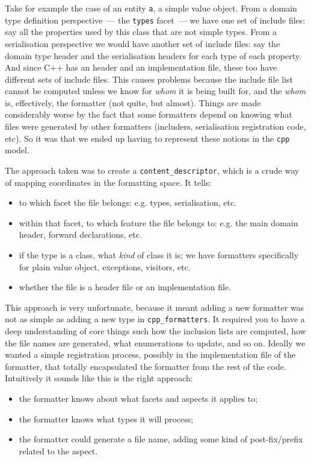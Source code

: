 \documentclass{book}
\begin{document}
Take for example the case of an entity \texttt{a}, a simple value
object. From a domain type definition perspective~--- the
\texttt{types} facet~--- we have one set of include files: say all the
properties used by this class that are not simple types. From a
serialisation perspective we would have another set of include files:
say the domain type header and the serialisation headers for each type
of each property. And since C++ has an header and an implementation
file, these too have different sets of include files. This causes
problems because the include file list cannot be computed unless we
know for \emph{whom} it is being built for, and the \emph{whom} is,
effectively, the formatter (not quite, but almost). Things are made
considerably worse by the fact that some formatters depend on knowing
what files were generated by other formatters (includers,
serialisation registration code, etc). So it was that we ended up
having to represent these notions in the \texttt{cpp} model.

The approach taken was to create a \texttt{content\_descriptor}, which
is a crude way of mapping coordinates in the formatting space. It
tells:

\begin{itemize}
\item to which facet the file belongs: e.g. types, serialisation, etc.
\item within that facet, to which feature the file belongs to:
  e.g. the main domain header, forward declarations, etc.
\item if the type is a class, what \emph{kind} of class it is; we have
  formatters specifically for plain value object, exceptions,
  visitors, etc.
\item whether the file is a header file or an implementation file.
\end{itemize}

This approach is very unfortunate, because it meant adding a new
formatter was not as simple as adding a new type in
\texttt{cpp\_formatters}. It required you to have a deep understanding
of core things such how the inclusion lists are computed, how the file
names are generated, what enumerations to update, and so on. Ideally
we wanted a simple registration process, possibly in the
implementation file of the formatter, that totally encapsulated the
formatter from the rest of the code. Intuitively it sounds like this
is the right approach:

\begin{itemize}
\item the formatter knows about what facets and aspects it applies to;
\item the formatter knows what types it will process;
\item the formatter could generate a file name, adding some kind of
  post-fix/prefix related to the aspect.
\end{itemize}
\end{document}
